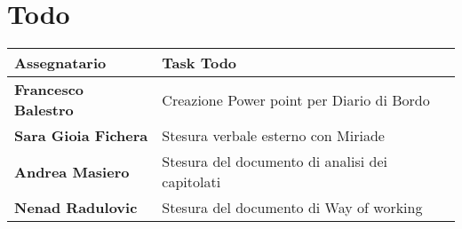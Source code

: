 \documentclass[a4paper,12pt]{article}
\begin{document}
\section{Todo}

\begin{tabularx}{\textwidth}{|X|X|}
\hline
\textbf{Assegnatario} & \textbf{Task Todo} \\
\hline
\textbf{Francesco Balestro} & Creazione Power point per Diario di Bordo \\
\hline
\textbf{Sara Gioia Fichera} & Stesura verbale esterno con Miriade
\\
\hline
\textbf{Andrea Masiero} &Stesura del documento di analisi dei capitolati\\
\hline
\textbf{Nenad Radulovic} & Stesura del documento di Way of working\\
\hline
\end{tabularx}
\end{document}
